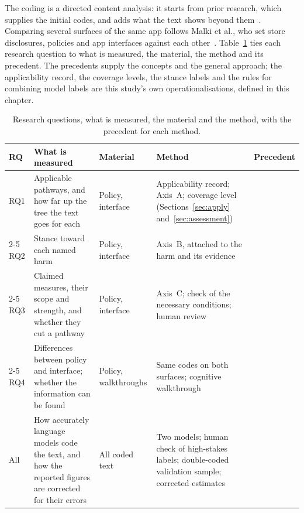 The coding is a directed content analysis: it starts from prior research, which
supplies the initial codes, and adds what the text shows beyond
them~\parencite{hsieh2005three,krippendorff2019content}. Comparing several surfaces
of the same app follows Malki et al., who set store disclosures, policies and app
interfaces against each other~\parencite[p.~4]{malki2024exploring}. Table~\ref{tab:rq-method}
ties each research question to what is measured, the material, the method and its precedent.
The precedents supply the concepts and the general approach; the applicability record, the
coverage levels, the stance labels and the rules for combining model labels are this study's
own operationalisations, defined in this chapter.

\begin{table}[H]
\centering
\begin{singlespace}
\caption[Research questions, methods and precedents]{Research questions, what is
measured, the material and the method, with the precedent for each method.}
\label{tab:rq-method}
\footnotesize
\begin{tabularx}{\textwidth}{@{}l>{\raggedright\arraybackslash}p{3.4cm}>{\raggedright\arraybackslash}p{2.0cm}>{\raggedright\arraybackslash}X>{\raggedright\arraybackslash}p{2.4cm}@{}}
\toprule
\textbf{RQ} & \textbf{What is measured} & \textbf{Material} & \textbf{Method} & \textbf{Precedent} \\
\midrule
RQ1 & Applicable pathways, and how far up the tree the text goes for each
  & Policy, interface
  & Applicability record; Axis~A; coverage level (Sections~\ref{sec:apply} and~\ref{sec:assessment})
  & \cite{knabenhans2026harms,de2016privacy,hsieh2005three,shipp2020period} \\
\cmidrule[0.3pt]{2-5}
RQ2 & Stance toward each named harm
  & Policy, interface
  & Axis~B, attached to the harm and its evidence
  & \cite{zou2019might} \\
\cmidrule[0.3pt]{2-5}
RQ3 & Claimed measures, their scope and strength, and whether they cut a pathway
  & Policy, interface
  & Axis~C; check of the necessary conditions; human review
  & \cite{knabenhans2026harms,martin2025cookies} \\
\cmidrule[0.3pt]{2-5}
RQ4 & Differences between policy and interface; whether the information can be found
  & Policy, walkthroughs
  & Same codes on both surfaces; cognitive walkthrough
  & \cite{wharton1994cognitive,malki2024exploring,habib2020scavenger} \\
\midrule
All & How accurately language models code the text, and how the reported figures are corrected for their errors
  & All coded text
  & Two models; human check of high-stakes labels; double-coded validation sample; corrected estimates
  & \cite{tornberg2024best,baumann2025llm,egami2023using} \\
\bottomrule
\end{tabularx}
\end{singlespace}
\end{table}

